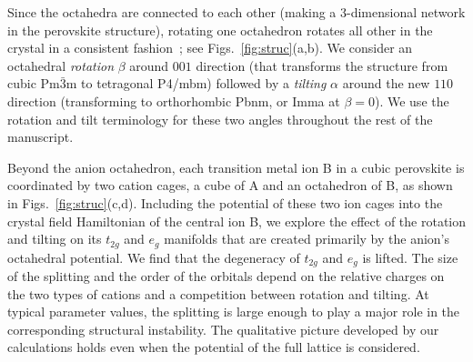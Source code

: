\documentclass[a4paper,prb,twocolumn]{revtex4-1}  %
\newcommand{\com}[1]{}
\begin{document}

Since the octahedra are connected to each other 
(making a 3-dimensional network in the perovskite structure),
rotating one octahedron rotates all other in the crystal in a consistent fashion~\cite{GlazerAC72};
 see Figs.~\ref{fig:struc}(a,b).
We consider an octahedral \emph{rotation} $\beta$ around $001$ direction
(that transforms the structure from cubic Pm$\bar 3$m to tetragonal P4/mbm)
followed by a \emph{tilting} $\alpha$ around the new $110$ direction
(transforming to orthorhombic Pbnm, 
or Imma 
 at ${\beta=0}$).
We use the rotation and tilt terminology for these 
two angles throughout the rest of the manuscript.


Beyond the anion octahedron,
each transition metal ion B in a cubic perovskite
is coordinated by two cation cages,
a cube of A and an octahedron of B, as shown in Figs.~\ref{fig:struc}(c,d).
Including the 
potential of these two ion cages
into the 
crystal field Hamiltonian of 
the central ion B,
we explore the effect 
of the rotation and tilting on 
its $t_{2g}$ and $e_g$ manifolds
that are
created primarily by the anion's octahedral potential.
We find that the degeneracy of $t_{2g}$ and $e_g$
is lifted. 
The size of the splitting 
and 
the order of the orbitals
depend
on the relative charges on the two types of cations
and a competition between rotation and tilting.
At typical parameter values,
the splitting is large enough 
to play a major role in 
the corresponding structural instability. 
The qualitative picture developed by our calculations 
holds even when the potential of the full lattice is considered.



\com{
$\alpha=0, \beta \neq 0$\\
Tetragonal:
127. P 4 / m b m
$\alpha \neq 0,\beta=0$\\
Orthorhombic:
74. I m m a
$\alpha,\beta \neq 0$\\
Orthorhombic:
62. Pbnm
}
\end{document}
